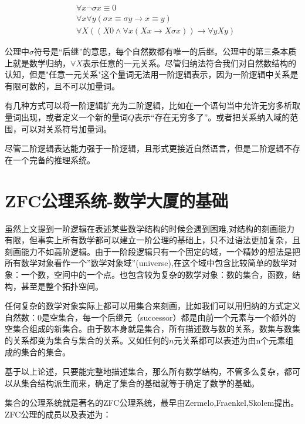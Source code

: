    \begin{equation}
     \begin{aligned}
     	      &\forall x \lnot \sigma x \equiv  0 \\
						&\forall x \forall y (\sigma x \equiv \sigma y \rightarrow x \equiv y)\\
						& \forall X ((X0 \land \forall x(Xx \rightarrow X \sigma x)) \rightarrow \forall y X y)
     \end{aligned}
   \end{equation}

   公理中$\sigma$符号是“后继”的意思，每个自然数都有唯一的后继。公理中的第三条本质上就是数学归纳，$\forall X$表示任意的一元关系。尽管归纳法符合我们对自然数结构的认知，但是"任意一元关系"这个量词无法用一阶逻辑表示，因为一阶逻辑中关系是有限可数的，且不可以加量词。

	 有几种方式可以将一阶逻辑扩充为二阶逻辑，比如在一个语句当中允许无穷多析取量词出现，或者定义一个新的量词$Q$表示“存在无穷多了”。或者把关系纳入域的范围，可以对关系符号加量词。

	 尽管二阶逻辑表达能力强于一阶逻辑，且形式更接近自然语言，但是二阶逻辑不存在一个完备的推理系统。



\section{ZFC公理系统-数学大厦的基础}

    虽然上文提到一阶逻辑在表述某些数学结构的时候会遇到困难,对结构的刻画能力有限，但事实上所有数学都可以建立一阶公理的基础上，只不过语法更加复杂，且刻画能力不如高阶逻辑。由于一阶段逻辑只有一个固定的域，一个精妙的想法是把所有数学对象看作一个”数学对象域”(universe),在这个域中包含比较简单的数学对象：一个数，空间中的一个点。也包含较为复杂的数学对象：数的集合，函数，结构，甚至是整个拓扑空间。

	 	任何复杂的数学对象实际上都可以用集合来刻画，比如我们可以用归纳的方式定义自然数：0是空集合，每一个后继元（successor）都是由前一个元素与一个额外的空集合组成的新集合。由于数本身就是集合，所有描述数与数的关系，数集与数集的关系都变为集合与集合的关系。又如任何的$n$元关系都可以表述为由n个元素组成的集合的集合。


		基于以上论述，只要能完整地描述集合，那么所有数学结构，不管多么复杂，都可以从集合结构派生而来，确定了集合的基础就等于确定了数学的基础。


    集合的公理系统就是著名的ZFC公理系统，最早由Zermelo,Fraenkel,Skolem提出。
    ZFC公理的成员以及表述为：

